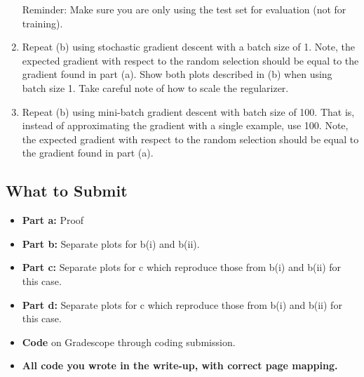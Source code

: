 \documentclass{article}
\begin{document}
\begin{sloppypar}
\begin{aprob}
\begin{enumerate}
        Reminder: Make sure you are only using the test set for evaluation (not for training).
          
        \item {} Repeat (b) using stochastic gradient descent with a batch size of 1. Note, the expected gradient with respect to the random selection should be equal to the gradient found in part (a). Show both plots described in (b) when using batch size 1. Take careful note of how to scale the regularizer.
        \item {} Repeat (b) using mini-batch gradient descent with batch size of 100. That is, instead of approximating the gradient with a single example, use 100. Note, the expected gradient with respect to the random selection should be equal to the gradient found in part (a).
    \end{enumerate}
    
    \subsection*{What to Submit}
    \begin{itemize}
        \item \textbf{Part a:} Proof
        \item \textbf{Part b:} Separate plots for b(i) and b(ii).
        \item \textbf{Part c:} Separate plots for c which reproduce those from b(i) and b(ii) for this case.
        \item \textbf{Part d:} Separate plots for c which reproduce those from b(i) and b(ii) for this case.
        \item \textbf{Code} on Gradescope through coding submission.
        \item \textbf{All code you wrote in the write-up, with correct page mapping.}
    \end{itemize}

\end{aprob}
\end{sloppypar}
\end{document}

